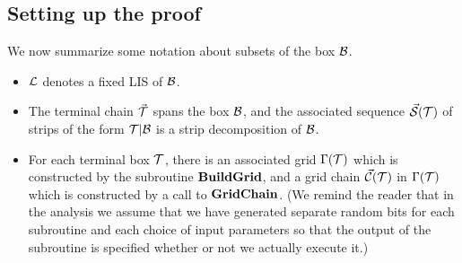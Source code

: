 \documentclass{acmsmall}
\newcommand{\cB}{{\cal B}}
\newcommand{\cC}{{\cal C}}
\newcommand{\cL}{{\cal L}}
\newcommand{\cS}{{\cal S}}
\newcommand{\cT}{{\cal T}}
\newcommand{\strip}[2]{#1|#2}
\newcommand{\buildgrid}{{\rm {\bf BuildGrid}}}
\newcommand{\gridchain}{{\rm {\bf GridChain}}}
\begin{document}
%
\subsection{Setting up the proof} \label{sec:stripnot}

We now summarize some notation about subsets of the box $\cB$.
\begin{itemize}
\item $\cL$ denotes a fixed LIS of $\cB$.
\item   The terminal chain $\vec{\cT}$ spans the box $\cB$, and the associated sequence $\vec{\cS}(\cT)$ of strips of the form
$\strip{\cT}{\cB}$ is a strip decomposition of $\cB$.
\item For  each terminal box $\cT$, there is an associated grid $\Gamma(\cT)$ which is constructed by the subroutine
$\buildgrid$, and a grid chain $\vec{\cC}(\cT)$ 
in $\Gamma(\cT)$  which is constructed by a call to $\gridchain$.  (We remind the reader that in the analysis we assume
that we have generated separate random bits for each subroutine and each choice of input parameters so that
the output of the subroutine is specified whether or not we actually execute it.)
\end{itemize}
  
\end{document}
